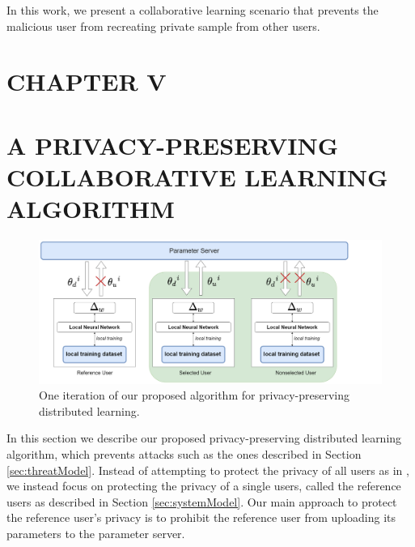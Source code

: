 \documentclass[letterpaper]{article}
\begin{document}
\begin{flushleft}
{%

In this work, we present a collaborative learning scenario that prevents the malicious user from recreating private sample
from other users. 

\pagebreak
\section*{CHAPTER V}
\vspace{0.25in}
\section{A PRIVACY-PRESERVING COLLABORATIVE LEARNING ALGORITHM}


\begin{figure}[H]
  \centering
    \includegraphics[width=7in]{OurHighLevelApproach.png}
    \caption[Privacy-preserving Distritbuted Learning.]{\label{fig:HighLevel} One iteration of our proposed algorithm for privacy-preserving distributed learning.}
  \end{figure}

In this section we describe our proposed privacy-preserving distributed learning algorithm, which prevents attacks
such as the ones described in Section \ref{sec:threatModel}. Instead of attempting to protect the privacy of all users as in 
\cite{shokri2015privacy}, we instead focus on protecting the privacy of a single users, called the reference users as described in
Section \ref{sec:systemModel}. Our main approach to protect the reference user's privacy is to prohibit the reference user
from uploading its parameters to the  parameter server. 

}
\end{flushleft}
\end{document}
